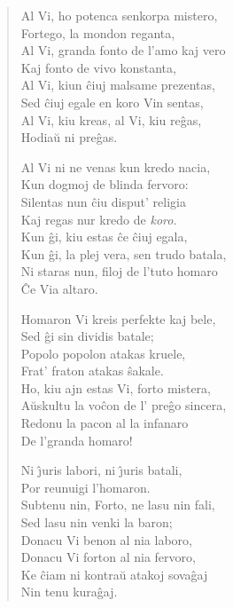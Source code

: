 \begin{verse}
                   Al Vi, ho potenca senkorpa mistero,\\
                Fortego, la mondon reganta,\\
                Al Vi, granda fonto de l'amo kaj vero\\
                Kaj fonto de vivo konstanta,\\
                Al Vi, kiun \^ciuj malsame prezentas,\\
                Sed \^ciuj egale en koro Vin sentas,\\
                Al Vi, kiu kreas, al Vi, kiu re\^gas,\\
                Hodia\u u ni pre\^gas.

                   Al Vi ni ne venas kun kredo nacia,\\
                Kun dogmoj de blinda fervoro:\\
                Silentas nun \^ciu disput' religia\\
                Kaj regas nur kredo de {\sl koro}.\\
                Kun \^gi, kiu estas \^ce \^ciuj egala,\\
                Kun \^gi, la plej vera, sen trudo batala,\\
                Ni staras nun, filoj de l'tuto homaro\\
                \^Ce Via altaro.

                   Homaron Vi kreis perfekte kaj bele,\\
                Sed \^gi sin dividis batale;\\
                Popolo popolon atakas kruele,\\
                Frat' fraton atakas \^sakale.\\
                Ho, kiu ajn estas Vi, forto mistera,\\
                A\u uskultu la vo\^con de l' pre\^go sincera,\\
                Redonu la pacon al la infanaro\\
                De l'granda homaro!

                   Ni \^{\j}uris labori, ni \^{\j}uris batali,\\
                Por reunuigi l'homaron.\\
                Subtenu nin, Forto, ne lasu nin fali,\\
                Sed lasu nin venki la baron;\\
                Donacu Vi benon al nia laboro,\\
                Donacu Vi forton al nia fervoro,\\
                Ke \^ciam ni kontra\u u atakoj sova\^gaj\\
                Nin tenu kura\^gaj.


\end{verse}
